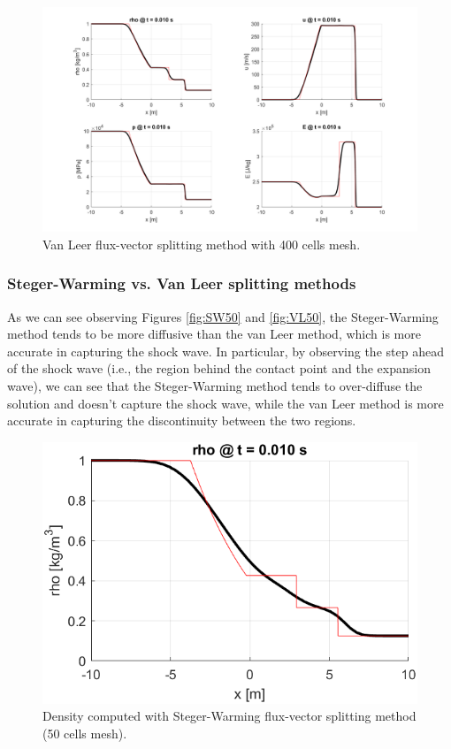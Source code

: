\begin{figure}[H]
    \centering
    \includegraphics[width=\textwidth]{img/states/VL400.png}
    \caption{Van Leer flux-vector splitting method with 400 cells mesh.}
    \label{fig:VL400}
\end{figure}


\subsubsection{Steger-Warming vs. Van Leer splitting methods}

As we can see observing Figures \ref{fig:SW50} and \ref{fig:VL50}, the Steger-Warming method tends to be more diffusive than the van Leer method, which is more accurate in capturing the shock wave.
In particular, by observing the step ahead of the shock wave (i.e., the region behind the contact point and the expansion wave), we can see that the Steger-Warming method tends to over-diffuse the solution and doesn't capture the shock wave, while the van Leer method is more accurate in capturing the discontinuity between the two regions.

\begin{figure}[H]
    \centering
    \includegraphics[width=.6\textwidth]{img/SW50_rho.png}
    \caption{Density computed with Steger-Warming flux-vector splitting method (50 cells mesh).}
    \label{fig:SW50_zoom}
\end{figure}

